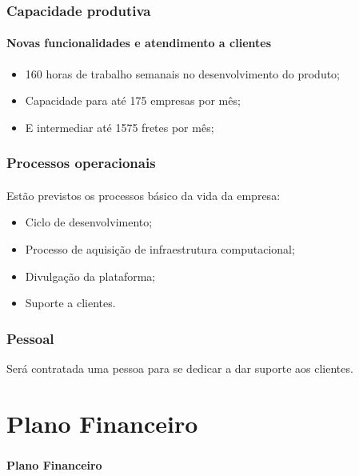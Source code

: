 \documentclass{beamer}
\begin{document}
\begin{frame}
  \frametitle{Capacidade produtiva}
  \framesubtitle{Novas funcionalidades e atendimento a clientes}

  \begin{itemize}
    \item 160 horas de trabalho semanais no desenvolvimento do produto;
    \item Capacidade para até 175 empresas por mês;
    \item E intermediar até 1575 fretes por mês;
  \end{itemize}

\end{frame}

\begin{frame}
  \frametitle{Processos operacionais}
  \framesubtitle{}

  Estão previstos os processos básico da vida da empresa:
  \begin{itemize}
    \item Ciclo de desenvolvimento;
    \item Processo de aquisição de infraestrutura computacional;
    \item Divulgação da plataforma;
    \item Suporte a clientes.
  \end{itemize}

\end{frame}

\begin{frame}
  \frametitle{Pessoal}

  Será contratada uma pessoa para se dedicar a dar suporte aos clientes.

\end{frame}

\section{Plano Financeiro}
\begin{frame}
  \frametitle{}
  \framesubtitle{}

  \begin{center}
    {\huge\textbf{Plano Financeiro}}
  \end{center}
\end{frame}
\end{document}
